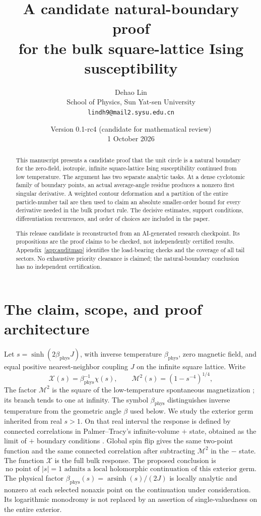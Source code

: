 \documentclass[11pt]{article}
\title{A candidate natural-boundary proof\\
for the bulk square-lattice Ising susceptibility}
\author{Dehao Lin\\
\small School of Physics, Sun Yat-sen University\\
\small\texttt{lindh9@mail2.sysu.edu.cn}}
\date{Version 0.1-rc4 (candidate for mathematical review)\\1 October 2026}
\numberwithin{equation}{section}
\theoremstyle{definition}
\newcommand{\M}{\mathcal M}
\begin{document}
\maketitle

\begin{abstract}
This manuscript presents a candidate proof that the unit circle is a
natural boundary for the zero-field, isotropic, infinite square-lattice
Ising susceptibility continued from low temperature. The argument has
two separate analytic tasks. At a dense cyclotomic family of boundary
points, an actual average-angle residue produces a nonzero first
singular derivative. A weighted contour deformation and a partition of
the entire particle-number tail are then used to claim an absolute
smaller-order bound for every derivative needed in the bulk product
rule. The decisive estimates, support conditions, differentiation
recurrences, and order of choices are included in the paper.

This release candidate is reconstructed from an AI-generated research checkpoint.
Its propositions are the proof claims to be checked, not independently
certified results. Appendix~\ref{app:auditmap} identifies the load-bearing
checks and the coverage of all tail sectors. No exhaustive priority
clearance is claimed; the natural-boundary conclusion has no
independent certification.
\end{abstract}

\section{The claim, scope, and proof architecture}\label{sec:scope}
Let \(s=\sinh(2\beta_{\mathrm{phys}} J)\), with inverse temperature
\(\beta_{\mathrm{phys}}\), zero magnetic field, and equal positive
nearest-neighbor coupling \(J\) on the infinite square lattice. Write
\[
 \mathcal X(s)=\beta_{\mathrm{phys}}^{-1}\chi(s),\qquad
 \M^2(s)=(1-s^{-4})^{1/4},
\]
The factor \(\M^2\) is the square of the low-temperature spontaneous
magnetization \cite{Yang1952}; its branch tends to one at infinity.
The symbol \(\beta_{\mathrm{phys}}\) distinguishes inverse temperature
from the geometric angle \(\beta\) used below. We study the exterior
germ inherited from real \(s>1\). On that real interval the response is
defined by connected correlations in Palmer--Tracy's infinite-volume
\(+\) state, obtained as the limit of \(+\) boundary conditions
\cite[pp.~332, 361]{PalmerTracy1981}. Global spin flip gives the same
two-point function and the same connected correlation after subtracting
\(\M^2\) in the \(-\) state. The function \(\mathcal X\) is the full
bulk response. The proposed conclusion is
\[
 \text{no point of }|s|=1\text{ admits a local holomorphic
 continuation of this exterior germ.}
\]
The physical factor \(\beta_{\mathrm{phys}}(s)=\operatorname{arsinh}(s)/(2J)\) is locally
analytic and nonzero at each selected nonaxis point on the continuation
under consideration. Its logarithmic monodromy is not replaced by an
assertion of single-valuedness on the entire exterior.
\end{document}
